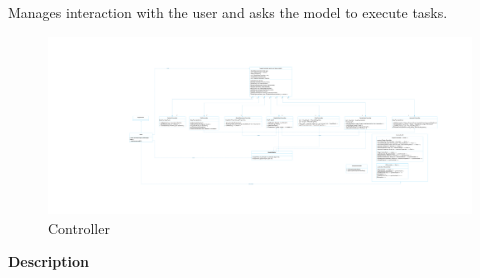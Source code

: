 
Manages interaction with the user and asks the model to execute tasks. 
	\begin{figure}
	\centering
\includegraphics[width=\textwidth]{abbildungen/ControllerOhneMethodenBeschreibung.pdf}
\caption{Controller }
	\label{img:controller}
	\end{figure}


\textbf{Description}

